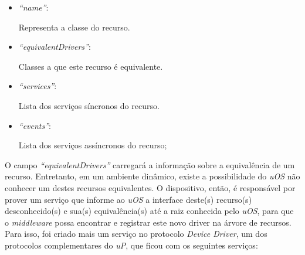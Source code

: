 \begin{itemize}
	\item \emph{``name''}:
		
		Representa a classe do recurso.
	\item \emph{``equivalentDrivers''}:
	
		Classes a que este recurso é equivalente.
	\item \emph{``services''}:

		Lista dos serviços síncronos do recurso.
	\item \emph{``events''}:

		Lista dos serviços assíncronos do recurso;
\end{itemize}

O campo \emph{``equivalentDrivers''} carregará a informação sobre a equivalência de um recurso. Entretanto, em um ambiente dinâmico, existe a possibilidade do \emph{uOS} não conhecer um destes recursos equivalentes. O dispositivo, então, é responsável por prover um serviço que informe ao \emph{uOS} a interface deste(s) recurso(s) desconhecido(s) e sua(s) equivalência(s) até a raiz conhecida pelo \emph{uOS}, para que o \emph{middleware} possa encontrar e registrar este novo driver na árvore de recursos. Para isso, foi criado mais um serviço no protocolo \emph{Device Driver}, um dos protocolos complementares do \emph{uP}, que ficou com os seguintes serviços:

